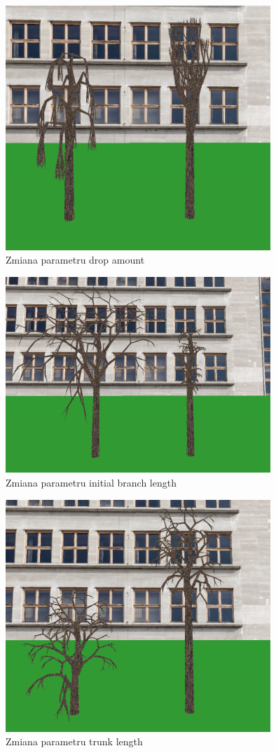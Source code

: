 \documentclass[a4paper,twoside,12pt]{report}
\begin{document}
\begin{figure}[H]
	\centering\includegraphics[width=10cm]{grafika/params/DropAmount.png}
	\caption{Zmiana parametru drop amount}
    \label{fig:dropAmount}
\end{figure}

\begin{figure}[H]
	\centering\includegraphics[width=10cm]{grafika/params/InitBranchLen.png}
	\caption{Zmiana parametru initial branch length}
    \label{fig:initBranchLen}
\end{figure}

\begin{figure}[H]
	\centering\includegraphics[width=10cm]{grafika/params/TrunkLen.png}
	\caption{Zmiana parametru trunk length}
    \label{fig:trunkLen}
\end{figure}
\end{document}
